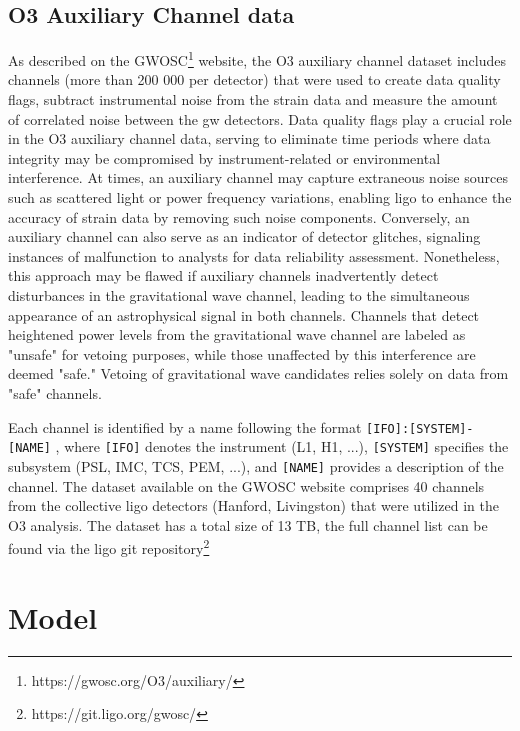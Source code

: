 \subsection{O3 Auxiliary Channel data}
As described on the GWOSC\footnote{https://gwosc.org/O3/auxiliary/} website, the O3 auxiliary channel dataset includes channels (more than 200 000 per detector) that were used to create data quality flags, subtract instrumental noise from the strain data and measure the amount of correlated noise between the \acrshort{gw} detectors. 
Data quality flags play a crucial role in the O3 auxiliary channel data, serving to eliminate time periods where data integrity may be compromised by instrument-related or environmental interference. At times, an auxiliary channel may capture extraneous noise sources such as scattered light or power frequency variations, enabling \acrshort{ligo} to enhance the accuracy of strain data by removing such noise components. Conversely, an auxiliary channel can also serve as an indicator of detector glitches, signaling instances of malfunction to analysts for data reliability assessment. Nonetheless, this approach may be flawed if auxiliary channels inadvertently detect disturbances in the gravitational wave channel, leading to the simultaneous appearance of an astrophysical signal in both channels. Channels that detect heightened power levels from the gravitational wave channel are labeled as "unsafe" for vetoing purposes, while those unaffected by this interference are deemed "safe." Vetoing of gravitational wave candidates relies solely on data from "safe" channels. 

Each channel is identified by a name following the format \verb|[IFO]:[SYSTEM]-[NAME]| , where \verb|[IFO]|  denotes the instrument (L1, H1, ...), \verb|[SYSTEM]|  specifies the subsystem (PSL, IMC, TCS, PEM, ...), and \verb|[NAME]|  provides a description of the channel. The dataset available on the GWOSC website comprises 40 channels from the collective \acrshort{ligo} detectors (Hanford, Livingston) that were utilized in the O3 analysis. The dataset has a total size of 13 TB, the full channel list can be found via the \acrshort{ligo} git repository\footnote{https://git.ligo.org/gwosc/}
\citep{GravitySpy20Wiki}

\section{Model}
